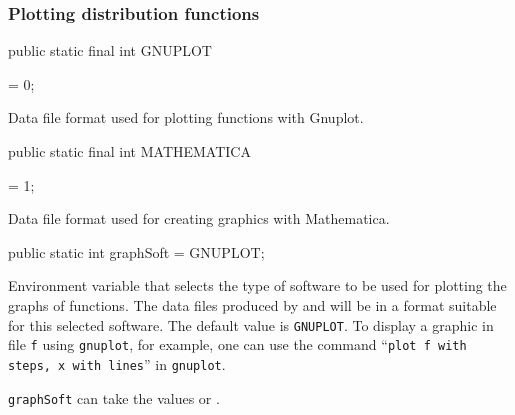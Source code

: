 \subsubsection*{Plotting distribution functions}

\begin{code}

   public static final int GNUPLOT\begin{hide} = 0; \end{hide}
\end{code}
 \begin{tabb}  Data file format used for plotting functions with Gnuplot.
 \end{tabb}
\begin{code}

   public static final int MATHEMATICA\begin{hide} = 1; \end{hide}
\end{code}
 \begin{tabb}  Data file format used for creating graphics with Mathematica.
 \end{tabb}
\begin{code}

   public static int graphSoft = GNUPLOT;
\end{code}
 \begin{tabb} Environment variable that selects the type of software to be
   used for plotting the graphs of functions.
   The data files produced by  and
    will be in a format suitable
   for this selected software.
   The default value is \texttt{GNUPLOT}.
   To display a graphic in file \texttt{f} using \texttt{gnuplot}, for example,
   one can use the command ``\texttt{plot f with steps, x with lines}''
   in \texttt{gnuplot}.
\begin{htmlonly}
  \texttt{graphSoft} can take the values  or .
\end{htmlonly}
 \end{tabb}
